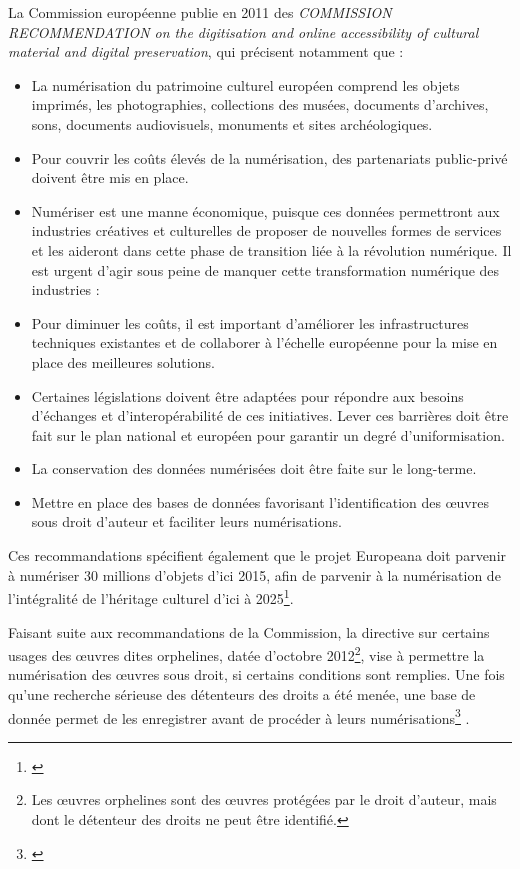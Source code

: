 La Commission européenne publie en 2011 des \textit{COMMISSION RECOMMENDATION on the digitisation and online accessibility of cultural material and digital preservation}, qui précisent notamment que : 
\begin{itemize}
\item La numérisation du patrimoine culturel européen comprend les objets imprimés, les photographies, collections des musées, documents d'archives, sons, documents audiovisuels, monuments et sites archéologiques.
\item Pour couvrir les coûts élevés de la numérisation, des partenariats public-privé doivent être mis en place.
\item Numériser est une manne économique, puisque ces données permettront aux industries créatives et culturelles de proposer de nouvelles formes de services et les aideront dans cette phase de transition liée à la révolution numérique. Il est urgent d'agir sous peine de manquer cette transformation numérique des industries :  
\item Pour diminuer les coûts, il est important d'améliorer les infrastructures techniques existantes et de collaborer à l'échelle européenne pour la mise en place des meilleures solutions.
\item Certaines législations doivent être adaptées pour répondre aux besoins d'échanges et d'interopérabilité de ces initiatives. Lever ces barrières doit être fait sur le plan national et européen pour garantir un degré d'uniformisation. 
\item La conservation des données numérisées doit être faite sur le long-terme.
\item Mettre en place des bases de données favorisant l'identification des \oe{}uvres sous droit d'auteur et faciliter leurs numérisations.
\end{itemize}
Ces recommandations spécifient également que le projet Europeana doit parvenir à numériser 30 millions d'objets d'ici 2015, afin de parvenir à la numérisation de l'intégralité de l'héritage culturel d'ici à 2025\footnote{\cite{coutts_stepping_2017}}.

Faisant suite aux recommandations de la Commission, la directive sur certains usages des \oe{}uvres dites orphelines, datée d'octobre 2012\footnote{Les \oe{}uvres orphelines sont des \oe{}uvres protégées par le droit d'auteur, mais dont le détenteur des droits ne peut être identifié.}, vise à permettre la numérisation des \oe{}uvres sous droit, si certains conditions sont remplies. Une fois qu'une recherche sérieuse des détenteurs des droits a été menée, une base de donnée permet de les enregistrer avant de procéder à leurs numérisations\footnote{\cite{noauthor_orphan_nodate}} .

